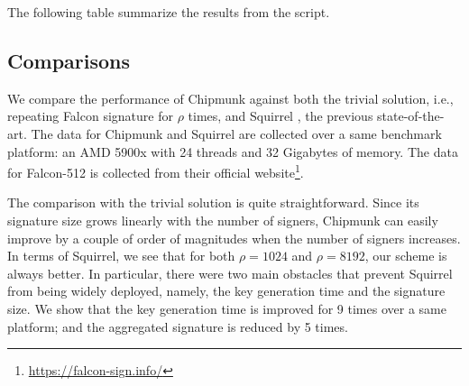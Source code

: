 The following table summarize the results from the script.

% 
\subsection{Comparisons}\label{ss:comparison}

We compare the performance of Chipmunk against both the trivial solution, i.e., repeating Falcon signature for $\rho$ times, and
Squirrel \cite{CCS:FleSimZha22}, the previous state-of-the-art. The data for Chipmunk and Squirrel are collected over a same benchmark platform: an AMD 5900x with 24 threads
and 32 Gigabytes of memory. The data for Falcon-512 is collected from their official website\footnote{\url{https://falcon-sign.info/}}.

The comparison with the trivial solution is quite straightforward. Since its signature size grows linearly with the number of signers,
Chipmunk can easily improve by a couple of order of magnitudes when the number of signers increases.
In terms of Squirrel, we see that for both $\rho = 1024$ and $\rho = 8192$, our scheme is always better. 
In particular, there were two main obstacles that prevent Squirrel from being widely deployed, namely, the key generation time
and the signature size. We show that the key generation time is improved for 9 times over a same platform; and the 
aggregated signature is reduced by 5 times. 

